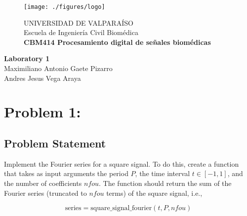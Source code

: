\documentclass[10pt]{article}
\theoremstyle{definition}
\theoremstyle{remark}
\theoremstyle{definition}
\numberwithin{equation}{prob}
\begin{document}
	
	\begin{titlepage}
		
		
		\begin{figure}
			\begin{minipage}{4cm}
				\texttt{[image: ./figures/logo]}
			\end{minipage}
			\begin{minipage}{11cm}
				\vspace{4mm}
				{\sc UNIVERSIDAD DE VALPARAÍSO}\\
				Escuela de Ingeniería Civil Biomédica\\
				{\bf CBM414 Procesamiento digital de señales biomédicas}\\
				\vspace{0mm}
				\hrulefill
			\end{minipage}
		\end{figure}
		\phantom{""}\vspace{60mm}
		
		
		\begin{center}
			\Huge{\textbf{Laboratory 1}}\vspace{95mm}\\
			\raggedleft \Large{Maximiliano Antonio Gaete Pizarro}\\ 
            \Large{Andres Jesus Vega Araya}\\
		\end{center}
		
		
	\end{titlepage}
	
\printindex

\section*{Problem 1:}

\subsection*{Problem Statement}

Implement the Fourier series for a square signal. To do this, create a function that takes as input arguments the period \(P\), the time interval \( t \in [-1, 1] \), and the number of coefficients \( nfou \). The function should return the sum of the Fourier series (truncated to \( nfou \) terms) of the square signal, i.e., 

\[
\text{{series}} = \text{{square\_signal\_fourier}}(t, P, nfou)
\]
\end{document}
